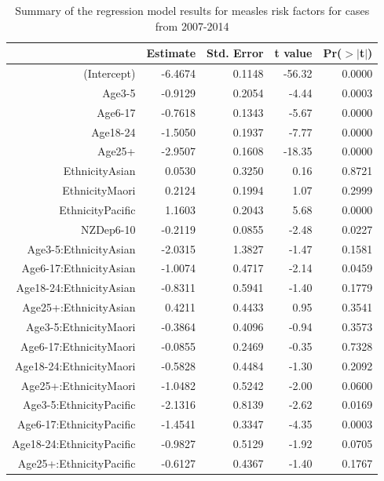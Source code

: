 \documentclass{article}
\begin{document}
\vspace{5mm} %
\begin{table}
\begin{tabular}{rrrrr}
  \hline
 & Estimate & Std. Error & t value & Pr($>$$|$t$|$) \\ 
  \hline
(Intercept) & -6.4674 & 0.1148 & -56.32 & 0.0000 \\ 
  Age3-5 & -0.9129 & 0.2054 & -4.44 & 0.0003 \\ 
  Age6-17 & -0.7618 & 0.1343 & -5.67 & 0.0000 \\ 
  Age18-24 & -1.5050 & 0.1937 & -7.77 & 0.0000 \\ 
  Age25+ & -2.9507 & 0.1608 & -18.35 & 0.0000 \\ 
  EthnicityAsian & 0.0530 & 0.3250 & 0.16 & 0.8721 \\ 
  EthnicityMaori & 0.2124 & 0.1994 & 1.07 & 0.2999 \\ 
  EthnicityPacific & 1.1603 & 0.2043 & 5.68 & 0.0000 \\ 
  NZDep6-10 & -0.2119 & 0.0855 & -2.48 & 0.0227 \\ 
  Age3-5:EthnicityAsian & -2.0315 & 1.3827 & -1.47 & 0.1581 \\ 
  Age6-17:EthnicityAsian & -1.0074 & 0.4717 & -2.14 & 0.0459 \\ 
  Age18-24:EthnicityAsian & -0.8311 & 0.5941 & -1.40 & 0.1779 \\ 
  Age25+:EthnicityAsian & 0.4211 & 0.4433 & 0.95 & 0.3541 \\ 
  Age3-5:EthnicityMaori & -0.3864 & 0.4096 & -0.94 & 0.3573 \\ 
  Age6-17:EthnicityMaori & -0.0855 & 0.2469 & -0.35 & 0.7328 \\ 
  Age18-24:EthnicityMaori & -0.5828 & 0.4484 & -1.30 & 0.2092 \\ 
  Age25+:EthnicityMaori & -1.0482 & 0.5242 & -2.00 & 0.0600 \\ 
  Age3-5:EthnicityPacific & -2.1316 & 0.8139 & -2.62 & 0.0169 \\ 
  Age6-17:EthnicityPacific & -1.4541 & 0.3347 & -4.35 & 0.0003 \\ 
  Age18-24:EthnicityPacific & -0.9827 & 0.5129 & -1.92 & 0.0705 \\ 
  Age25+:EthnicityPacific & -0.6127 & 0.4367 & -1.40 & 0.1767 \\ 
   \hline
\end{tabular}\caption{Summary of the regression model results for measles risk factors for cases from 2007-2014}
\label{table:regression}
\end{table}
\vspace{5mm} %
\end{document}
